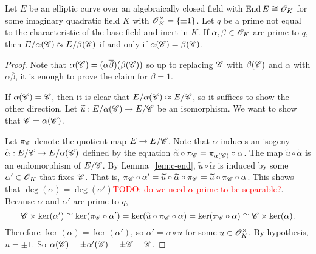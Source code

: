 \documentclass{amsart}
\begin{document}
\begin{lemma}\label{lem:c-subgps-distinct-quotients}
  Let $E$ be an elliptic curve over an algebraically closed field with $\operatorname{End} E \cong \mathscr{O}_K$ for some imaginary quadratic field $K$ with $\mathscr{O}_K^\times = \{\pm 1\}$. Let $q$ be a prime not equal to the characteristic of the base field and inert in $K$. If $\alpha,\beta \in \mathscr{O}_K$ are prime to $q$, then $E/\alpha(\mathscr{C}) \approx E/\beta(\mathscr{C})$ if and only if $\alpha(\mathscr{C}) = \beta(\mathscr{C})$.
\end{lemma}
\begin{proof}
  Note that $\alpha(\mathscr{C}) = (\alpha\overline{\beta})(\beta(\mathscr{C}))$ so up to replacing $\mathscr{C}$ with $\beta(\mathscr{C})$ and $\alpha$ with $\alpha\overline{\beta}$, it is enough to prove the claim for $\beta = 1$.

  If $\alpha(\mathscr{C}) = \mathscr{C}$, then it is clear that $E/\alpha(\mathscr{C}) \approx E/\mathscr{C}$, so it suffices to show the other direction. Let $\widetilde{u}: E/\alpha(\mathscr{C}) \to E/\mathscr{C}$ be an isomorphism. We want to show that $\mathscr{C} = \alpha(\mathscr{C})$.

  Let $\pi_{\mathscr{C}}$ denote the quotient map $E \to E/\mathscr{C}$. Note that $\alpha$ induces an isogeny $\widetilde{\alpha}: E/\mathscr{C} \to E/\alpha(\mathscr{C})$ defined by the equation $\widetilde{\alpha}\circ\pi_{\mathscr{C}} = \pi_{\alpha(\mathscr{C})} \circ \alpha$. The map $\tilde{u}\circ\tilde{\alpha}$ is an endomorphism of $E/\mathscr{C}$. By Lemma~\ref{lem:c-end}, $\tilde{u}\circ\tilde{\alpha}$ is induced by some $\alpha' \in \mathscr{O}_K$ that fixes $\mathscr{C}$. That is, $\pi_{\mathscr{C}}\circ\alpha' = \widetilde{u}\circ\widetilde{\alpha}\circ\pi_{\mathscr{C}} = \widetilde{u}\circ\pi_{\mathscr{C}}\circ\alpha$. This shows that $\deg(\alpha) = \deg(\alpha')$\textcolor{red}{TODO: do we need $\alpha$ prime to be separable?}. Because $\alpha$ and $\alpha'$ are prime to $q$,
  \[
    \mathscr{C} \times \ker(\alpha')
    \cong
    \ker(\pi_{\mathscr{C}} \circ \alpha')
    =
    \ker(\widetilde{u}\circ\pi_{\mathscr{C}}\circ\alpha)
    =
    \ker(\pi_{\mathscr{C}}\circ\alpha)
    \cong
    \mathscr{C} \times \ker(\alpha).
  \]
  Therefore $\ker(\alpha) = \ker(\alpha')$, so $\alpha' = \alpha\circ u$ for some $u \in \mathscr{O}_K^\times$. By hypothesis, $u = \pm 1$. So $\alpha(\mathscr{C}) = \pm\alpha'(\mathscr{C}) = \pm\mathscr{C} = \mathscr{C}$.

\end{proof}
\end{document}
